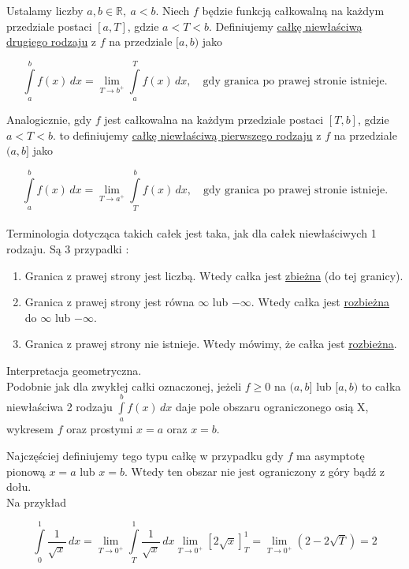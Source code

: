 \documentclass[12pt]{article}
\begin{document}
Ustalamy liczby $ a,b \in \mathbb{R}, \ a < b $. Niech $f$ będzie funkcją całkowalną na każdym przedziale postaci $[a, T] $,
gdzie $ a < T < b $. Definiujemy \underline{całkę niewłaściwą drugiego rodzaju} z $f$ na przedziale $[a, b)$ jako

$$ \int\limits_{a}^{b} f(x) \,dx = \lim_{T \to b^+} \int\limits_{a}^{T} f(x) \,dx, \quad \textrm{gdy granica po prawej stronie istnieje.}$$

Analogicznie, gdy $f$ jest całkowalna na każdym przedziale postaci $[T,b]$, gdzie $ a < T < b $. to definiujemy
\underline{całkę niewłaściwą pierwszego rodzaju} z $f$ na przedziale $(a, b]$ jako

$$ \int\limits_{a}^{b} f(x) \,dx = \lim_{T \to a^+} \int\limits_{T}^{b} f(x) \,dx, \quad \textrm{gdy granica po prawej stronie istnieje.}$$\\

Terminologia dotycząca takich całek jest taka, jak dla całek niewłaściwych 1 rodzaju. Są 3 przypadki : 

\begin{enumerate}
    \item Granica z prawej strony jest liczbą. Wtedy całka jest \underline{zbieżna} (do tej granicy).
    \item Granica z prawej strony jest równa $\infty$ lub $-\infty$. Wtedy całka jest \underline{rozbieżna} do $\infty$ lub $-\infty$.
    \item Granica z prawej strony nie istnieje. Wtedy mówimy, że całka jest \underline{rozbieżna}. \\
\end{enumerate}

Interpretacja geometryczna. \\

Podobnie jak dla zwykłej całki oznaczonej, jeżeli $f \geq 0$ na $(a,b]$ lub $[a,b)$ to całka niewłaściwa 2 rodzaju
$ \int\limits_{a}^{b} f(x) \,dx $ daje pole obszaru ograniczonego osią X, wykresem $f$ oraz prostymi $x=a$ oraz $x=b$.

Najczęściej definiujemy tego typu całkę w przypadku gdy $f$ ma asymptotę pionową $x=a$ lub $x=b$. Wtedy ten obszar
nie jest ograniczony z góry bądź z dołu. \\

Na przykład

$$ \int\limits_{0}^{1} \frac{1}{\sqrt{x}} \,dx = \lim_{T \to 0^+} \int\limits_{T}^{1} \frac{1}{\sqrt{x}} \,dx
\lim_{T \to 0^+} [2\sqrt{x}]_T^1 = \lim_{T \to 0^+} (2 - 2\sqrt{T}) = 2 $$
\end{document}
